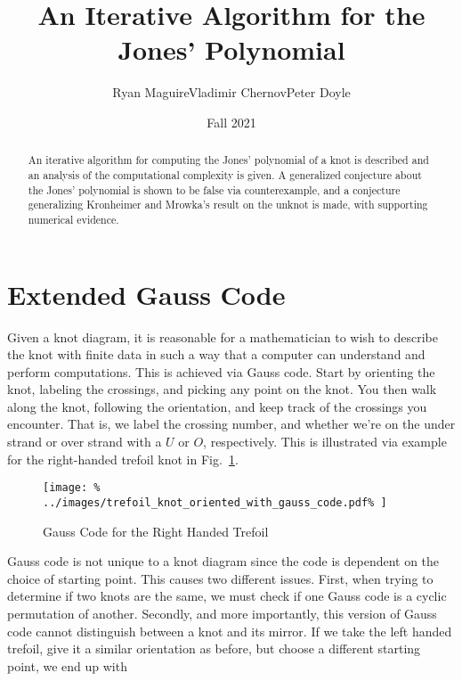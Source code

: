 \documentclass{article}
\title{An Iterative Algorithm for the Jones' Polynomial}
\author{Ryan Maguire\hspace{2em}Vladimir Chernov\hspace{2em}Peter Doyle}
\date{Fall 2021}
\theoremstyle{plain}
\begin{document}
    \maketitle
    \tableofcontents
    \begin{abstract}
        \noindent
        An iterative algorithm for computing the Jones' polynomial of a knot
        is described and an analysis of the computational complexity is given.
        A generalized conjecture about the Jones' polynomial is shown to be
        false via counterexample, and a conjecture generalizing Kronheimer and
        Mrowka's result on the unknot is made, with supporting numerical
        evidence.
    \end{abstract}
    \section{Extended Gauss Code}
        Given a knot diagram, it is reasonable for a mathematician to wish to
        describe the knot with finite data in such a way that a computer can
        understand and perform computations. This is achieved via Gauss code.
        Start by orienting the knot, labeling the crossings, and
        picking any point on the knot. You then walk along the knot, following
        the orientation, and keep track of the crossings you encounter. That is,
        we label the crossing number, and whether we're on the under strand or
        over strand with a $U$ or $O$, respectively. This is
        illustrated via example for the right-handed trefoil knot in
        Fig.~\ref{fig:right_handed_trefoil_gauss_code}.
        \begin{figure}
            \centering
            \texttt{[image: \%
                ../images/trefoil\_knot\_oriented\_with\_gauss\_code.pdf\%
            ]}
            \caption{Gauss Code for the Right Handed Trefoil}
            \label{fig:right_handed_trefoil_gauss_code}
        \end{figure}
        Gauss code is not unique to a knot diagram since the code is dependent
        on the choice of starting point. This causes two different issues.
        First, when trying to determine if two knots are the same, we must
        check if one Gauss code is a cyclic permutation of another. Secondly,
        and more importantly, this version of Gauss code cannot distinguish
        between a knot and its mirror. If we take the left handed trefoil,
        give it a similar orientation as before, but choose a different
        starting point, we end up with
\end{document}
